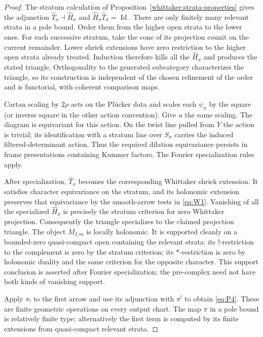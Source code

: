\begin{proof}
The stratum calculation of
Proposition~\ref{whittaker:strata-properties} gives the adjunction
$\widehat T_\sigma\dashv\widehat H_\sigma$ and
$\widehat H_\sigma\widehat T_\sigma=\operatorname{Id}$.
There are only finitely many relevant strata in a pole bound.
Order them from the higher open strata to the lower ones.
For each successive stratum, take the cone of its projection
counit on the current remainder.  Lower shriek extensions have
zero restriction to the higher open strata already treated.
Induction therefore kills all the $\widehat H_\sigma$ and
produces the stated triangle.  Orthogonality to the generated
subcategory characterizes the triangle, so its construction is
independent of the chosen refinement of the order and is
functorial, with coherent comparison maps.

Cartan scaling by $2\rho$ acts on the Pl\"ucker data and scales
each $\psi_\sigma$ by the square (or inverse square in the other
action convention).  Give $u$ the same scaling.  The diagram is
equivariant for this action.  On the twist line pulled from $Y$
the action is trivial; its identification with a stratum line
over $S_\sigma$ carries the induced filtered-determinant action.
Thus the required dilation equivariance persists in frame
presentations containing Kummer factors.  The Fourier
specialization rules apply.

After specialization, $\widehat T_\sigma$ becomes the corresponding
Whittaker shriek extension.  It satisfies character equivariance
on the stratum, and its holonomic extension preserves that
equivariance by the smooth-arrow tests in \eqref{eq:W1}.
Vanishing of all the specialized $\widehat H_\sigma$ is precisely
the stratum criterion for zero Whittaker projection.
Consequently the triangle specializes to the claimed projection
triangle.  The object $M_{I,m}$ is locally holonomic.  It is
supported cleanly on a bounded-zero quasi-compact open containing
the relevant strata: its $!$-restriction to the complement is
zero by the stratum criterion; its $*$-restriction is zero by
holonomic duality and the same criterion for the opposite
character.  This support conclusion is asserted after Fourier
specialization; the pre-complex need not have both kinds of
vanishing support.

Apply $\pi_!$ to the first arrow and use its adjunction with
$\pi^!$ to obtain \eqref{eq:P4}.  These are finite geometric
operations on every output chart.  The map $\pi$ in a pole
bound is relatively finite type; alternatively the first term
is computed by its finite extensions from quasi-compact
relevant strata.


\end{proof}
